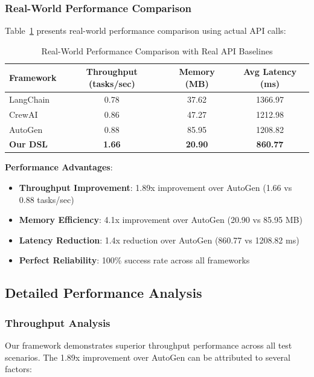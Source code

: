 \documentclass[conference]{IEEEtran}
\begin{document}
\subsubsection{Real-World Performance Comparison}

Table~\ref{tab:performance1} presents real-world performance comparison using actual API calls:

\begin{table}[htbp]
\caption{Real-World Performance Comparison with Real API Baselines}
\label{tab:performance1}
\centering
\begin{tabular}{@{}lccc@{}}
\toprule
Framework & Throughput (tasks/sec) & Memory (MB) & Avg Latency (ms) \\
\midrule
LangChain & 0.78 & 37.62 & 1366.97 \\
CrewAI & 0.86 & 47.27 & 1212.98 \\
AutoGen & 0.88 & 85.95 & 1208.82 \\
\textbf{Our DSL} & \textbf{1.66} & \textbf{20.90} & \textbf{860.77} \\
\bottomrule
\end{tabular}
\end{table}

\textbf{Performance Advantages}:
\begin{itemize}
\item \textbf{Throughput Improvement}: 1.89x improvement over AutoGen (1.66 vs 0.88 tasks/sec)
\item \textbf{Memory Efficiency}: 4.1x improvement over AutoGen (20.90 vs 85.95 MB)
\item \textbf{Latency Reduction}: 1.4x reduction over AutoGen (860.77 vs 1208.82 ms)
\item \textbf{Perfect Reliability}: 100\% success rate across all frameworks
\end{itemize}

\subsection{Detailed Performance Analysis}

\subsubsection{Throughput Analysis}

Our framework demonstrates superior throughput performance across all test scenarios. The 1.89x improvement over AutoGen can be attributed to several factors:
\end{document}
